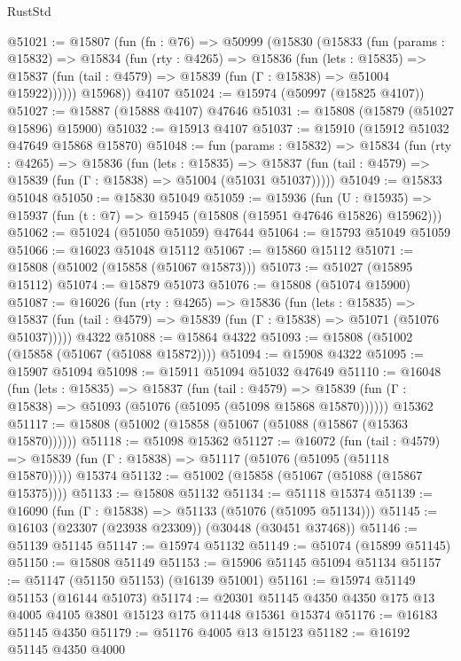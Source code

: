 \begin{lexlean}{RustStd}
\begin{coremodule}
@51021 := @15807
    (fun (fn : @76) =>
    @50999
      (@15830
        (@15833
          (fun (params : @15832) =>
          @15834
            (fun (rty : @4265) =>
            @15836
              (fun (lets : @15835) =>
              @15837 (fun (tail : @4579) => @15839 (fun (Γ : @15838) => @51004 @15922))))))
        @15968))
    @4107
@51024 := @15974 (@50997 (@15825 @4107))
@51027 := @15887 (@15888 @4107) @47646
@51031 := @15808 (@15879 (@51027 @15896) @15900)
@51032 := @15913 @4107
@51037 := @15910 (@15912 @51032 @47649 @15868 @15870)
@51048 := fun (params : @15832) =>
  @15834
    (fun (rty : @4265) =>
    @15836
      (fun (lets : @15835) =>
      @15837 (fun (tail : @4579) => @15839 (fun (Γ : @15838) => @51004 (@51031 @51037)))))
@51049 := @15833 @51048
@51050 := @15830 @51049
@51059 := @15936
    (fun (U : @15935) => @15937 (fun (t : @7) => @15945 (@15808 (@15951 @47646 @15826) @15962)))
@51062 := @51024 (@51050 @51059) @47644
@51064 := @15793 @51049 @51059
@51066 := @16023 @51048 @15112
@51067 := @15860 @15112
@51071 := @15808 (@51002 (@15858 (@51067 @15873)))
@51073 := @51027 (@15895 @15112)
@51074 := @15879 @51073
@51076 := @15808 (@51074 @15900)
@51087 := @16026
    (fun (rty : @4265) =>
    @15836
      (fun (lets : @15835) =>
      @15837 (fun (tail : @4579) => @15839 (fun (Γ : @15838) => @51071 (@51076 @51037)))))
    @4322
@51088 := @15864 @4322
@51093 := @15808 (@51002 (@15858 (@51067 (@51088 @15872))))
@51094 := @15908 @4322
@51095 := @15907 @51094
@51098 := @15911 @51094 @51032 @47649
@51110 := @16048
    (fun (lets : @15835) =>
    @15837
      (fun (tail : @4579) =>
      @15839 (fun (Γ : @15838) => @51093 (@51076 (@51095 (@51098 @15868 @15870))))))
    @15362
@51117 := @15808 (@51002 (@15858 (@51067 (@51088 (@15867 (@15363 @15870))))))
@51118 := @51098 @15362
@51127 := @16072
    (fun (tail : @4579) => @15839 (fun (Γ : @15838) => @51117 (@51076 (@51095 (@51118 @15870)))))
    @15374
@51132 := @51002 (@15858 (@51067 (@51088 (@15867 @15375))))
@51133 := @15808 @51132
@51134 := @51118 @15374
@51139 := @16090 (fun (Γ : @15838) => @51133 (@51076 (@51095 @51134)))
@51145 := @16103 (@23307 (@23938 @23309)) (@30448 (@30451 @37468))
@51146 := @51139 @51145
@51147 := @15974 @51132
@51149 := @51074 (@15899 @51145)
@51150 := @15808 @51149
@51153 := @15906 @51145 @51094 @51134
@51157 := @51147 (@51150 @51153) (@16139 @51001)
@51161 := @15974 @51149 @51153 (@16144 @51073)
@51174 := @20301 @51145 @4350 @4350 @175 @13 @4005 @4105 @3801 @15123 @175 @11448 @15361 @15374
@51176 := @16183 @51145 @4350
@51179 := @51176 @4005 @13 @15123
@51182 := @16192 @51145 @4350 @4000

\end{coremodule}
\end{lexlean}
